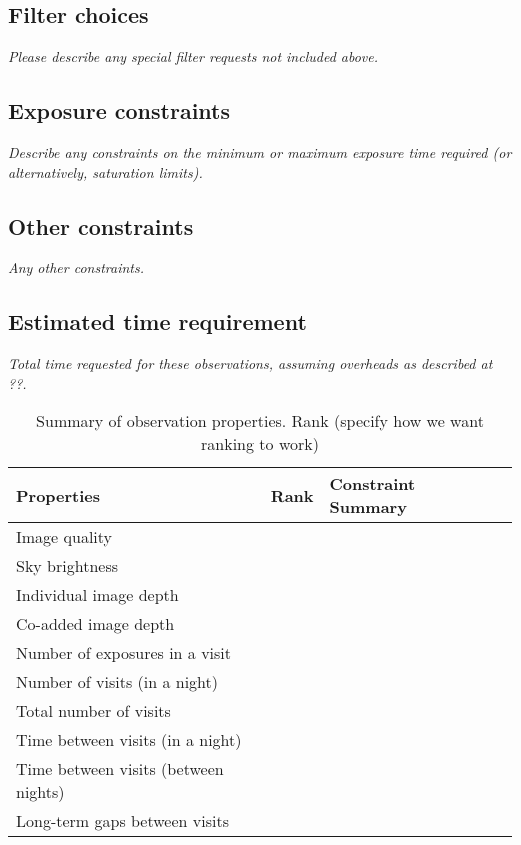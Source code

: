 \documentclass[11pt]{article}
\begin{document}
\subsection{Filter choices}
\begin{footnotesize}
{\it Please describe any special filter requests not included above.}
\end{footnotesize}

\subsection{Exposure constraints}
\begin{footnotesize}
{\it Describe any constraints on the minimum or maximum exposure time required (or alternatively, saturation limits).}
\end{footnotesize}

\subsection{Other constraints}
\begin{footnotesize}
{\it Any other constraints.}
\end{footnotesize}

\subsection{Estimated time requirement}
\begin{footnotesize}
{\it Total time requested for these observations, assuming overheads as described at ??.}
\end{footnotesize}


\begin{table}[htb]
    \centering
    \begin{tabular}{l|l|l|l}
        \toprule
        Properties & Rank & Constraint Summary \\
        \midrule
        Image quality &   &    \\
        Sky brightness &  &  \\
        Individual image depth &  &   \\
        Co-added image depth &  &   \\
        Number of exposures in a visit &  &   \\
        Number of visits (in a night) &  &   \\ 
        Total number of visits &  &   \\
        Time between visits (in a night) &  &  \\
        Time between visits (between nights) &  &   \\
        Long-term gaps between visits & & \\
        \bottomrule
    \end{tabular}
    \caption{Summary of observation properties. Rank (specify how we want ranking to work)}
    \label{tab:obs_constraints}
\end{table}
\end{document}
